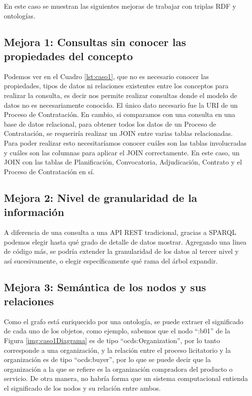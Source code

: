 En este caso se muestran las siguientes mejoras de trabajar con triplas RDF y ontologías.

\subsection{Mejora 1: Consultas sin conocer las propiedades del concepto}

Podemos ver en el Cuadro \ref{lst:caso1}, que no es necesario conocer las propiedades, tipos de datos ni relaciones existentes entre los conceptos para realizar la consulta, es decir nos permite realizar consultas donde el modelo de datos no es necesariamente conocido. El único dato necesario fue la URI de un Proceso de Contratación. En cambio, si comparamos con una consulta en una base de datos relacional, para obtener todos los datos de un Proceso de Contratación, se requeriría realizar un JOIN entre varias tablas relacionadas.  Para poder realizar esto necesitaríamos conocer cuáles son las tablas involucradas y cuáles son las columnas para aplicar el JOIN correctamente. En este caso, un JOIN con las tablas de Planificación, Convocatoria, Adjudicación, Contrato y el Proceso de Contratación en sí.

\subsection{Mejora 2: Nivel de granularidad de la información}

A diferencia de una consulta a una API REST tradicional, gracias a SPARQL podemos elegir hasta qué grado de detalle de datos mostrar. Agregando una linea de código más, se podría extender la granularidad de los datos al tercer nivel y así sucesivamente, o elegir específicamente qué rama del árbol expandir.

\subsection{Mejora 3: Semántica de los nodos y sus relaciones}

Como el grafo está enriquecido por una ontología, se puede extraer el significado de cada uno de los objetos, como ejemplo, sabemos que el nodo “:b01” de la Figura \ref{img:caso1Diagrama} es de tipo “ocds:Organization”, por lo tanto corresponde a una organización, y la relación entre el proceso licitatorio y la organización es de tipo “ocds:buyer”, por lo que se puede decir que la organización a la que se refiere es la organización compradora del producto o servicio. De otra manera, no habría forma que un sistema computacional entienda el significado de los nodos y su relación entre ambos.
    

